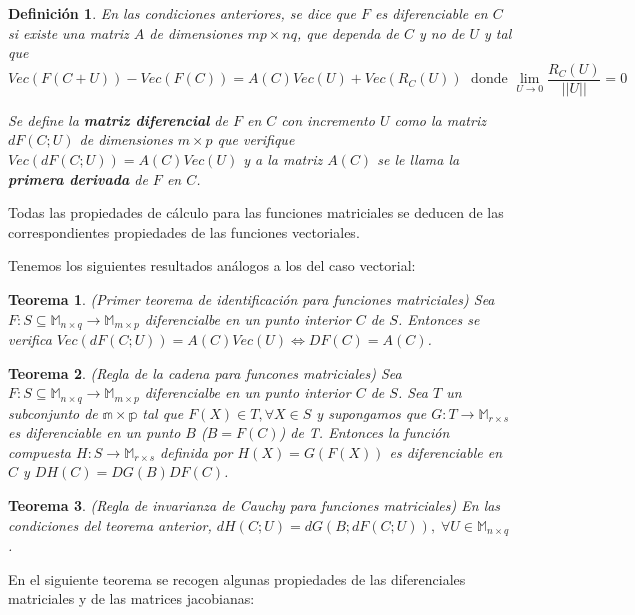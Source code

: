 \documentclass{article}
\theoremstyle{theorem-style}  %
\newtheorem{theorem}{Teorema}[section]  %
\theoremstyle{definition-style}
\newtheorem{definition}{Definición}[section]
\theoremstyle{example-style}
\theoremstyle{exercise-style}
\begin{document}
\begin{definition}
\textit{	En las condiciones anteriores, se dice que $F$ es diferenciable en $C$ si existe una matriz $A$ de dimensiones $mp\times nq$, que dependa de $C$ y no de $U$ y tal que}
	$$Vec(F(C+U))-Vec(F(C))=A(C)Vec(U)+Vec(R_C(U))\; \text{ donde } \lim\limits_{U\rightarrow 0} \frac{R_C(U)}{||U||} = 0$$
	
	\textit{Se define la \textbf{matriz diferencial} de $F$ en $C$ con incremento $U$ como la matriz $dF(C;U)$ de dimensiones $m\times p$ que verifique $Vec(dF(C;U))=A(C)Vec(U)$ y a la matriz $A(C)$ se le llama la \textbf{primera derivada} de $F$ en $C$.}
\end{definition}

Todas las propiedades de cálculo para las funciones matriciales se deducen de las correspondientes propiedades de las funciones vectoriales.

Tenemos los siguientes resultados análogos a los del caso vectorial:

\begin{theorem} (Primer teorema de identificación para funciones matriciales)
	Sea $F:S\subseteq \mathbb{M}_{n \times q}\rightarrow \mathbb{M}_{m \times p}$ diferencialbe en un punto interior $C$ de $S$. Entonces se verifica $Vec(dF(C;U))=A(C)Vec(U) \Leftrightarrow DF(C)=A(C)$.	
\end{theorem}

\begin{theorem} (Regla de la cadena para funcones matriciales)
	Sea $F:S\subseteq \mathbb{M}_{n \times q}\rightarrow \mathbb{M}_{m \times p}$ diferencialbe en un punto interior $C$ de $S$. Sea $T$ un subconjunto de $\mathbb{m\times p}$ tal que $F(X)\in T, \forall X\in S$ y supongamos que $G:T\rightarrow \mathbb{M}_{r\times s}$ es diferenciable en un punto $B$ ($B=F(C)$) de T. Entonces la función compuesta $H:S\rightarrow \mathbb{M}_{r\times s}$ definida por $H(X)=G(F(X))$ es diferenciable en $C$ y $DH(C)=DG(B)DF(C)$.
\end{theorem}

\begin{theorem}(Regla de invarianza de Cauchy para funciones matriciales)
	En las condiciones del teorema anterior, $dH(C;U)=dG(B;dF(C;U)), \; \forall U\in \mathbb{M}_{n\times q}$.	
\end{theorem}



En el siguiente teorema se recogen algunas propiedades de las diferenciales matriciales y de las matrices jacobianas:
\end{document}
